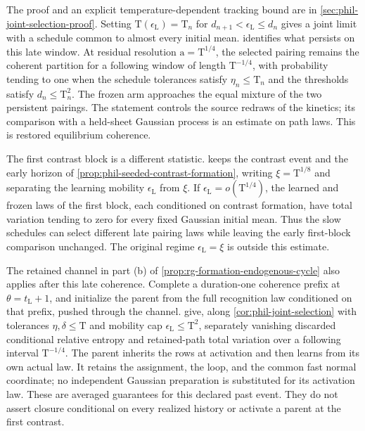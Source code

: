 The proof and an explicit temperature-dependent tracking bound are in
\cref{sec:phil-joint-selection-proof}. Setting
\(\mathrm T(\epsilon_{\mathrm L})=\mathrm T_n\) for
\(d_{n+1}<\epsilon_{\mathrm L}\le d_n\) gives a joint limit with a schedule
common to almost every initial mean.
 identifies what persists on this
late window. At residual resolution \(\mathrm a=\mathrm T^{1/4}\), the
selected pairing remains the coherent partition for a following window of
length \(\mathrm T^{-1/4}\), with probability tending to one when the schedule tolerances satisfy
\(\eta_n\le\mathrm T_n\) and the thresholds satisfy \(d_n\le\mathrm T_n^2\). The frozen arm approaches the equal
mixture of the two persistent pairings. The statement controls the source
redraws of the kinetics; its comparison with a held-sheet Gaussian process
is an estimate on path laws. This is restored equilibrium coherence.

The first contrast block is a different statistic.
 keeps the contrast event and the early
horizon of \cref{prop:phil-seeded-contrast-formation}, writing
\(\xi=\mathrm T^{1/8}\) and separating the learning mobility
\(\epsilon_{\mathrm L}\) from \(\xi\). If
\(\epsilon_{\mathrm L}=o(\mathrm T^{1/4})\), the learned and frozen laws of
the first block, each conditioned on contrast formation, have total
variation tending to zero for every fixed Gaussian initial mean. Thus the
slow schedules can select different late pairing laws while leaving the
early first-block comparison unchanged. The original regime
\(\epsilon_{\mathrm L}=\xi\) is outside this estimate.

The retained channel in part (b) of
\cref{prop:rg-formation-endogenous-cycle} also applies after this late
coherence. Complete a duration-one coherence prefix at
\(\theta=t_{\mathrm L}+1\), and initialize the parent from the full
recognition law conditioned on that prefix, pushed through the channel.
give, along \cref{cor:phil-joint-selection} with tolerances
\(\eta,\delta\le\mathrm T\) and mobility cap
\(\epsilon_{\mathrm L}\le\mathrm T^2\), separately vanishing discarded
conditional relative entropy and retained-path total variation over a
following interval \(\mathrm T^{-1/4}\). The parent inherits the rows at activation and then
learns from its own actual law. It retains the assignment, the loop, and
the common fast normal coordinate; no independent Gaussian preparation
is substituted for its activation law. These are averaged guarantees
for this declared past event. They do not assert closure conditional on
every realized history or activate a parent at the first contrast.

